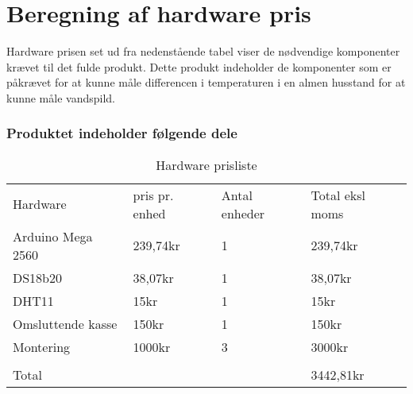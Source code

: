 \section{Beregning af hardware pris}
Hardware prisen set ud fra nedenstående tabel viser de nødvendige komponenter krævet til det fulde produkt. Dette produkt indeholder de komponenter som er påkrævet for at kunne måle differencen i temperaturen i en almen husstand for at kunne måle vandspild.
\subsubsection{Produktet indeholder følgende dele}  


\begin{table}[h]
\centering
\begin{tabular}{ |p{3cm}||p{3cm}|p{3cm}|p{3cm}|  }
 \hline
 \rowcolor{lightgray}\multicolumn{4}{|c|}{Pris beregning} \\
 \hline
 Hardware    & pris pr. enhed &Antal enheder&Total eksl moms\\
 \hline
 Arduino Mega 2560   & 239,74kr    &1&   239,74kr\\
 \hline
 DS18b20&   38,07kr  & 1   &38,07kr\\
 \hline
 DHT11 &15kr & 1&  15kr\\
 \hline
  Omsluttende kasse\footnotemark  &150kr & 1&  150kr\\
 \hline
  Montering &1000kr & 3&  3000kr\\
 \hline
 		&	&	&\\
 \hline
 Total	&	&	&3442,81kr\\
 \hline 
\end{tabular}
\caption{Hardware prisliste}
\end{table}

